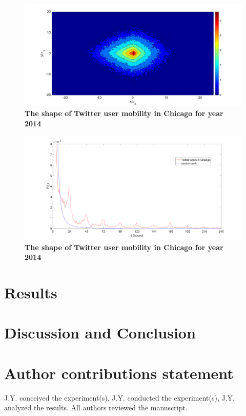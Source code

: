 \documentclass[fleqn,10pt]{wlscirep}
\begin{document}
\begin{figure}[ht]
	\includegraphics[width=1.0\linewidth]{./figure/Chicago_Shape_Fotor}
	\caption{{\bf The shape of Twitter user mobility in Chicago for year 2014}}
	\label{Fig_shape}
\end{figure}

\begin{figure}[ht]
	\includegraphics[width=1.0\linewidth]{./figure/firsttime}
	\caption{{\bf The shape of Twitter user mobility in Chicago for year 2014}}
	\label{first_time_passage}
\end{figure}




\section*{Results}

\section*{Discussion and Conclusion}



\section*{Author contributions statement}
J.Y. conceived the experiment(s),  J.Y. conducted the experiment(s), J.Y. analyzed the results.  All authors reviewed the manuscript. 


\end{document}
